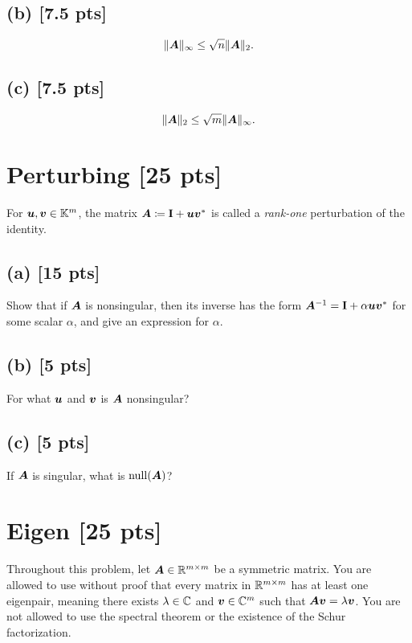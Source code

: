 \documentclass[twoside,10pt]{article}
\begin{document}
\subsection*{(b) [7.5 pts]}
\begin{equation*}
  \|\bm{A}\|_{\infty} \leq \sqrt{n}\|\bm{A}\|_2.
\end{equation*}

\subsection*{(c) [7.5 pts]}
\begin{equation*}
  \|\bm{A}\|_{2} \leq \sqrt{m}\|\bm{A}\|_{\infty}.
\end{equation*}

\section{Perturbing [25 pts]}
For $\bm{u}, \bm{v} \in \mathbb{K}^m$, the matrix $\bm{A} \coloneqq \mathbf{I} + \bm{u}\bm{v}^{*}$ is called a \emph{rank-one} perturbation of the identity. 

\subsection*{(a) [15 pts]}
Show that if $\bm{A}$ is nonsingular, then its inverse has the form $\bm{A}^{-1} = \mathbf{I} + \alpha \bm{u}\bm{v}^{*}$ for some scalar $\alpha$, and give an expression for $\alpha$.

\subsection*{(b) [5 pts]}
For what $\bm{u}$ and $\bm{v}$ is $\bm{A}$ nonsingular? 

\subsection*{(c) [5 pts]} 
If $\bm{A}$ is singular, what is $\operatorname{null}(\bm{A})$?

\section{Eigen [25 pts]}
Throughout this problem, let $\bm{A} \in \mathbb{R}^{m \times m}$ be a symmetric matrix. 
You are allowed to use without proof that every matrix in $\mathbb{R}^{m \times m}$ has at least one eigenpair, meaning there exists $\lambda \in \mathbb{C}$ and $\bm{v} \in \mathbb{C}^m$ such that $\bm{A}\bm{v} = \lambda \bm{v}$. 
You are not allowed to use the spectral theorem or the existence of the Schur factorization.
\end{document}
